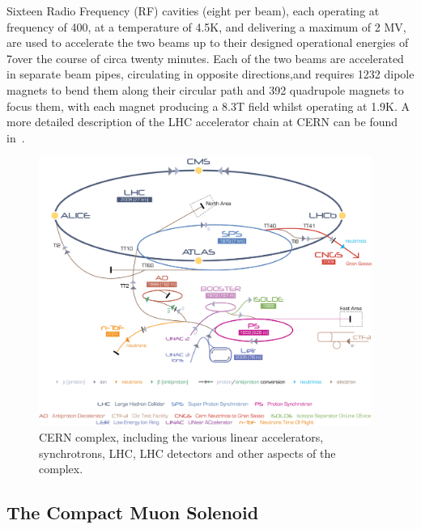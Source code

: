 Sixteen Radio Frequency (RF) cavities (eight per beam), each operating at frequency of 400\MHz, at a temperature of 4.5K, and delivering a maximum of 2 MV, are used to accelerate the two beams up to their designed operational energies of 7\TeV over the course of circa twenty minutes.
Each of the two beams are accelerated in separate beam pipes, circulating in opposite directions,and requires 1232 dipole magnets to bend them along their circular path and 392 quadrupole magnets to focus them, with each magnet producing a 8.3T field whilst operating at 1.9K.
A more detailed description of the LHC accelerator chain at CERN can be found in~\cite{Schindl:397574}. 

\begin{figure}[htbp]
\begin{center}
\includegraphics[width=0.97\textwidth]{figs/lhc/Cern-Accelerator-Complex.jpg}
\caption{CERN complex, including the various linear accelerators, synchrotrons, LHC, LHC detectors and other aspects of the complex.}
\label{fig:cern-accelerator-complex}
\end{center}
\end{figure}

\subsection{The Compact Muon Solenoid}\label{subsec:cms}

